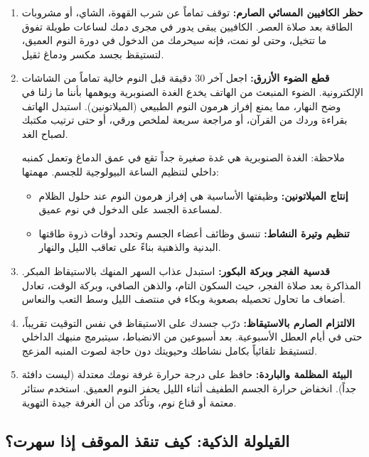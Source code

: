 \documentclass[12pt,a4paper]{book}
\begin{document}
\begin{enumerate}
	\item \textbf{حظر الكافيين المسائي الصارم:} توقف تماماً عن شرب القهوة، الشاي، أو مشروبات الطاقة بعد صلاة العصر. الكافيين يبقى يدور في مجرى دمك لساعات طويلة تفوق ما تتخيل، وحتى لو نمت، فإنه سيحرمك من الدخول في دورة النوم العميق، لتستيقظ بجسد مكسر ودماغ ثقيل.
	
	\item \textbf{قطع الضوء الأزرق:} اجعل آخر 30 دقيقة قبل النوم خالية تماماً من الشاشات الإلكترونية. الضوء المنبعث من الهاتف يخدع الغدة الصنوبرية ويوهمها بأننا ما زلنا في وضح النهار، مما يمنع إفراز هرمون النوم الطبيعي (الميلاتونين). استبدل الهاتف بقراءة وردك من القرآن، أو مراجعة سريعة لملخص ورقي، أو حتى ترتيب مكتبك لصباح الغد.
		
		ملاحظة: الغدة الصنوبرية هي غدة صغيرة جداً تقع في عمق الدماغ وتعمل كمنبه داخلي لتنظيم الساعة البيولوجية للجسم. مهمتها:
			\begin{itemize}
			\item \textbf{إنتاج الميلاتونين:} وظيفتها الأساسية هي إفراز هرمون النوم عند حلول الظلام لمساعدة الجسد على الدخول في نوم عميق.
			\item \textbf{تنظيم وتيرة النشاط:} تنسق وظائف أعضاء الجسم وتحدد أوقات ذروة طاقتها البدنية والذهنية بناءً على تعاقب الليل والنهار.
			\end{itemize}
	
	\item \textbf{قدسية الفجر وبركة البكور:} استبدل عذاب السهر المنهك بالاستيقاظ المبكر. المذاكرة بعد صلاة الفجر، حيث السكون التام، والذهن الصافي، وبركة الوقت، تعادل أضعاف ما تحاول تحصيله بصعوبة وبكاء في منتصف الليل وسط التعب والنعاس.
	
	\item \textbf{الالتزام الصارم بالاستيقاظ:} درّب جسدك على الاستيقاظ في نفس التوقيت تقريباً، حتى في أيام العطل الأسبوعية. بعد أسبوعين من الانضباط، سيتبرمج منبهك الداخلي لتستيقظ تلقائياً بكامل نشاطك وحيويتك دون حاجة لصوت المنبه المزعج.
	
	\item \textbf{البيئة المظلمة والباردة:} حافظ على درجة حرارة غرفة نومك معتدلة (ليست دافئة جداً). انخفاض حرارة الجسم الطفيف أثناء الليل يحفز النوم العميق. استخدم ستائر معتمة أو قناع نوم، وتأكد من أن الغرفة جيدة التهوية.
\end{enumerate}


\subsection{القيلولة الذكية: كيف تنقذ الموقف إذا سهرت؟}
\end{document}
